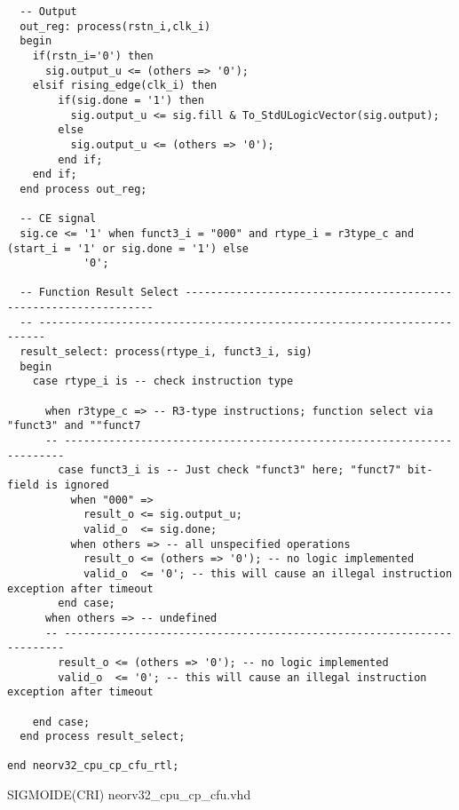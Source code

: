 \begin{code}
\begin{verbatim}
  -- Output
  out_reg: process(rstn_i,clk_i)
  begin
    if(rstn_i='0') then
      sig.output_u <= (others => '0');
    elsif rising_edge(clk_i) then
        if(sig.done = '1') then
          sig.output_u <= sig.fill & To_StdULogicVector(sig.output);     
        else
          sig.output_u <= (others => '0'); 
        end if;
    end if;
  end process out_reg;

  -- CE signal
  sig.ce <= '1' when funct3_i = "000" and rtype_i = r3type_c and (start_i = '1' or sig.done = '1') else
            '0';

  -- Function Result Select -----------------------------------------------------------------
  -- -----------------------------------------------------------------------
  result_select: process(rtype_i, funct3_i, sig)
  begin
    case rtype_i is -- check instruction type

      when r3type_c => -- R3-type instructions; function select via "funct3" and ""funct7
      -- ----------------------------------------------------------------------
        case funct3_i is -- Just check "funct3" here; "funct7" bit-field is ignored
          when "000" => 
            result_o <= sig.output_u; 
            valid_o  <= sig.done; 
          when others => -- all unspecified operations
            result_o <= (others => '0'); -- no logic implemented
            valid_o  <= '0'; -- this will cause an illegal instruction exception after timeout
        end case;
      when others => -- undefined
      -- ----------------------------------------------------------------------
        result_o <= (others => '0'); -- no logic implemented
        valid_o  <= '0'; -- this will cause an illegal instruction exception after timeout

    end case;
  end process result_select;

end neorv32_cpu_cp_cfu_rtl;
\end{verbatim}
\caption{SIGMOIDE(CRI) neorv32\_cpu\_cp\_cfu.vhd}
\label{ap-cod:25}
\end{code}

